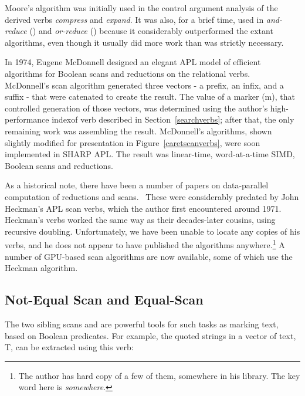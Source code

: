 \noindent Moore's algorithm was initially used in the 
control argument analysis of the derived verbs {\em compress} and {\em expand}.
It was also, for a brief time, used in 
{\em and-reduce} ({\apl \qand\qslash\qomega}) and 
{\em or-reduce} ({\apl \qor\qslash\qomega})
because it considerably outperformed the extant algorithms, even though 
it usually did more work than was strictly necessary.

In 1974, Eugene McDonnell designed an elegant APL model of
efficient algorithms for Boolean scans and reductions
on the relational verbs.~\cite{EEMcdonnell:caretfunctions}
McDonnell's scan algorithm generated 
three vectors - a prefix, an infix, and a suffix - that were catenated to create
the result. The value of a marker ({\apl m}), that controlled 
generation of those vectors, was determined using the author's
high-performance indexof verb described in Section~\ref{searchverbs};
after that, the only remaining work was assembling the result. 
McDonnell's algorithms, shown slightly modified
for presentation in Figure~\ref{caretscanverbs}, 
were soon implemented in SHARP APL.
The result was linear-time, word-at-a-time SIMD, Boolean scans
and reductions. 

As a historical note, there have been a number of papers
on data-parallel computation of reductions and 
scans.~\cite{GEBlelloch:prefixsums,GEBlelloch:scansasparallelprefix,
DHillis:dpalgs}
These were considerably predated by John Heckman's APL scan verbs,
which the author first encountered around 1971. Heckman's verbs
worked the same way as their decades-later cousins,
using recursive doubling. Unfortunately, we have been unable to
locate any copies of his verbs, and he does not appear to
have published the algorithms anywhere.\footnote{The author 
has hard copy of a few of them, somewhere in his library. The
key word here is {\em somewhere}.}
A number of GPU-based scan algorithms are now 
available, some of which use the Heckman 
algorithm.~\cite{MHarris:parallelprefixsumwithcuda}

\subsection{Not-Equal Scan and Equal-Scan}

The two sibling scans {\apl \qeq\qbslash\qomega} and
{\apl \qne\qbslash\qomega} are powerful tools for
such tasks as marking text, based on Boolean predicates. 
For example, the
quoted strings in a vector of text, {\apl T}, can
be extracted using this verb:

